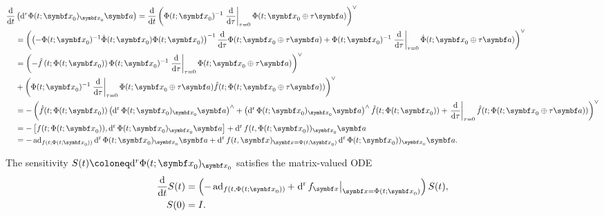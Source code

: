 \begin{equation*}
  \begin{aligned}
    \frac{\mathrm{d}}{\mathrm{d}t}
     & \left( \mathrm{d}^r \Phi(t; \x_0)_{\x_0} \a \right)
    = \frac{\mathrm{d}}{\mathrm{d}t} \left( \Phi(t; \x_{0})^{-1} \left. \frac{\mathrm{d}}{\mathrm{d} \tau} \right|_{\tau = 0} \Phi(t; \x_{0} \oplus \tau \a) \right)^{\vee}                                                                                                                          \\
     & = \left( \left( -\Phi(t; \x_{0})^{-1} \dot \Phi(t; \x_{0}) \Phi(t; \x_{0}) \right)^{-1} \frac{\mathrm{d}}{\mathrm{d}\tau} \Phi(t; \x_{0} \oplus \tau \a) +  \Phi(t; \x_{0})^{-1} \left. \frac{\mathrm{d}}{\mathrm{d}\tau} \right|_{\tau=0} \dot \Phi(t; \x_{0} \oplus \tau \a) \right)^{\vee} \\
     & = \left( -\hat f\left(t; \Phi(t; \x_{0})\right) \Phi(t; \x_{0})^{-1} \left. \frac{\mathrm{d}}{\mathrm{d}\tau} \right|_{\tau = 0} \Phi(t; \x_{0} \oplus \tau \a) \right)^\vee                                                                                                                  \\
     & + \left( \Phi(t; \x_{0})^{-1} \left. \frac{\mathrm{d}}{\mathrm{d}\tau} \right|_{\tau = 0} \Phi(t; \x_{0} \oplus \tau \a) \hat f(t; \Phi(t; \x_{0} \oplus \tau \a)) \right)^{\vee}                                                                                                             \\
     & = - \left( \hat f(t; \Phi(t; \x_{0})) \left( \dr \Phi(t; \x_{0})_{\x_{0}} \a \right)^{\wedge}
    + \left( \dr \Phi(t; \x_{0})_{\x_{0}} \a \right)^{\wedge} \hat f(t; \Phi(t; \x_{0}))  + \left. \frac{\mathrm{d}}{\mathrm{d}\tau} \right|_{\tau = 0} \hat f(t; \Phi(t; \x_{0} \oplus \tau \a)) \right)^{\vee}                                                                                     \\
     & = -\left[  f(t; \Phi(t; \x_{0})), \dr \Phi(t; \x_{0})_{\x_{0}} \a\right] + \dr f(t, \Phi(t; \x_{0}))_{\x_{0}} \a                                                                                                                                                                              \\
     & = -\ad_{f(t; \Phi(t; \x_{0}))} \dr \Phi(t; \x_{0})_{\x_{0}} \a + \dr f(t, \x)_{\x = \Phi(t; \x_{0})} \dr \Phi(t; \x_{0}))_{\x_{0}} \a.
  \end{aligned}
\end{equation*}
\begin{important}
  The sensitivity $S(t) \coloneq \mathrm{d}^r \Phi(t; \x_{0})_{\x_{0}}$ satisfies the matrix-valued ODE
  \begin{equation}
    \label{eq:sensitivity_direct}
    \begin{aligned}
      \frac{\mathrm{d}}{\mathrm{d}t} S(t) & = \left(-\ad_{f(t, \Phi(t; \x_{0}))} + \left. \dr f_{\x} \right|_{\x = \Phi(t; \x_{0})} \right) S(t), \\
      S(0)                                & = I.
    \end{aligned}
  \end{equation}
\end{important}

